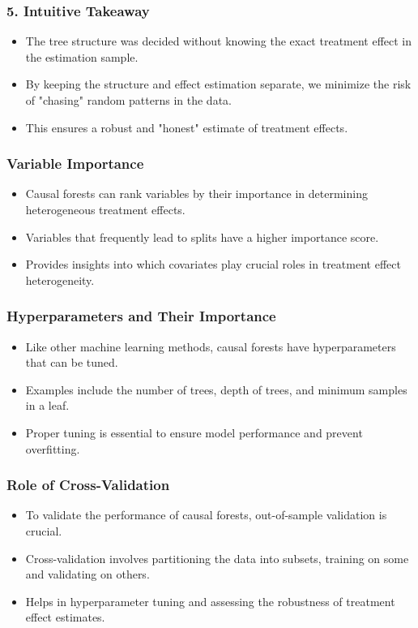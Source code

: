\documentclass{beamer}
\begin{document}
\begin{frame}
\frametitle{5. Intuitive Takeaway}
\begin{itemize}
    \item The tree structure was decided without knowing the exact treatment effect in the estimation sample.
    \item By keeping the structure and effect estimation separate, we minimize the risk of "chasing" random patterns in the data.
    \item This ensures a robust and "honest" estimate of treatment effects.
\end{itemize}
\end{frame}




\begin{frame}
\frametitle{Variable Importance}
\begin{itemize}
    \item Causal forests can rank variables by their importance in determining heterogeneous treatment effects.
    \item Variables that frequently lead to splits have a higher importance score.
    \item Provides insights into which covariates play crucial roles in treatment effect heterogeneity.
\end{itemize}
\end{frame}


\begin{frame}
\frametitle{Hyperparameters and Their Importance}
\begin{itemize}
    \item Like other machine learning methods, causal forests have hyperparameters that can be tuned.
    \item Examples include the number of trees, depth of trees, and minimum samples in a leaf.
    \item Proper tuning is essential to ensure model performance and prevent overfitting.
\end{itemize}
\end{frame}


\begin{frame}
\frametitle{Role of Cross-Validation}
\begin{itemize}
    \item To validate the performance of causal forests, out-of-sample validation is crucial.
    \item Cross-validation involves partitioning the data into subsets, training on some and validating on others.
    \item Helps in hyperparameter tuning and assessing the robustness of treatment effect estimates.
\end{itemize}
\end{frame}
\end{document}
